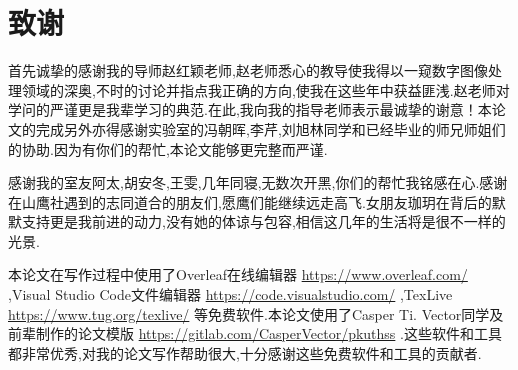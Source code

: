 
\chapter{致谢}
首先诚挚的感谢我的导师赵红颖老师,赵老师悉心的教导使我得以一窥数字图像处理领域的深奥,不时的讨论并指点我正确的方向,使我在这些年中获益匪浅.赵老师对学问的严谨更是我辈学习的典范.在此,我向我的指导老师表示最诚挚的谢意！本论文的完成另外亦得感谢实验室的冯朝晖,李芹,刘旭林同学和已经毕业的师兄师姐们的协助.因为有你们的帮忙,本论文能够更完整而严谨.
\par
感谢我的室友阿太,胡安冬,王雯,几年同寝,无数次开黑,你们的帮忙我铭感在心.感谢在山鹰社遇到的志同道合的朋友们,愿鹰们能继续远走高飞.女朋友珈玥在背后的默默支持更是我前进的动力,没有她的体谅与包容,相信这几年的生活将是很不一样的光景.
\par
本论文在写作过程中使用了Overleaf在线编辑器 \url{https://www.overleaf.com/} ,Visual Studio Code文件编辑器 \url{https://code.visualstudio.com/} ,TexLive \url{https://www.tug.org/texlive/} 等免费软件.本论文使用了Casper Ti. Vector同学及前辈制作的论文模版 \url{https://gitlab.com/CasperVector/pkuthss} .这些软件和工具都非常优秀,对我的论文写作帮助很大,十分感谢这些免费软件和工具的贡献者.


